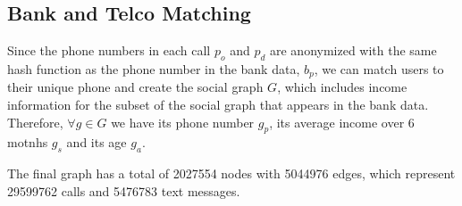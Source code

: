 \subsection{Bank and Telco Matching}

Since the phone numbers in each call $p_o$ and $p_d$ are anonymized with the same hash function as the phone number in the bank data, $b_p$, we can match users to their unique phone and create the social graph $G$, which includes income information for the subset of the social graph that appears in the bank data. Therefore, $\forall g \in G$ we have its phone number $g_p$, its average income over 6 motnhs $g_s$ and its age $g_a$.

The final graph has a total of \num{2027554} nodes with \num{5044976} edges, which represent \num{29599762} calls and \num{5476783} text messages.
